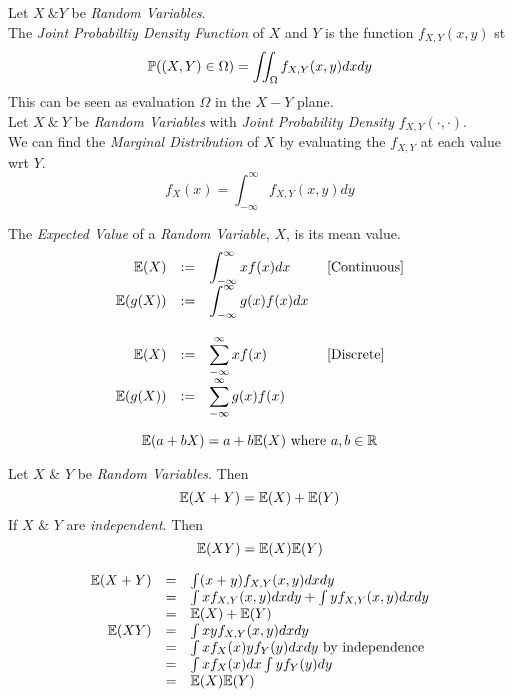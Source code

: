 \documentclass[11pt,a4paper]{article}
\begin{document}
Let $X\ \& Y$ be \textit{Random Variables}.\\
The \textit{Joint Probabiltiy Density Function} of $X$ and $Y$ is the function $f_{X,Y}(x,y)$ st
$$\mathbb{P}((X,Y)\in\Omega)=\iint_\Omega f_{X,Y}(x,y)dxdy$$
\nb This can be seen as evaluation $\Omega$ in the $X-Y$ plane.\\

Let $X\ \&\ Y$ be \textit{Random Variables} with \textit{Joint Probability Density} $f_{X,Y}(\cdot,\cdot)$.\\
We can find the \textit{Marginal Distribution} of $X$ by evaluating the $f_{X,Y}$ at each value wrt $Y$.
$$f_X(x)=\int_{-\infty}^\infty f_{X,Y}(x,y)dy$$

The \textit{Expected Value} of a \textit{Random Variable}, $X$, is its mean value.
\[\begin{array}{rcll}
\mathbb{E}(X)&:=&\displaystyle\int_{-\infty}^\infty xf(x)dx&\text{ [Continuous]}\\
\mathbb{E}(g(X))&:=&\displaystyle\int_{-\infty}^\infty g(x)f(x)dx&\\\\
\mathbb{E}(X)&:=&\displaystyle\sum_{-\infty}^\infty xf(x)&\text{ [Discrete]}\\
\mathbb{E}(g(X))&:=&\displaystyle\sum_{-\infty}^\infty g(x)f(x)&
\end{array}\]

$$\mathbb{E}(a+bX)=a+b\mathbb{E}(X)\text{ where }a,b\in\mathbb{R}$$

Let $X$ \& $Y$ be \textit{Random Variables}. Then
$$\mathbb{E}(X+Y)=\mathbb{E}(X)+\mathbb{E}(Y)$$
If $X$ \& $Y$ are \textit{independent}. Then
$$\mathbb{E}(XY)=\mathbb{E}(X)\mathbb{E}(Y)$$

\[\begin{array}{rcl}
\mathbb{E}(X+Y)&=&\int(x+y)f_{X,Y}(x,y)dxdy\\
&=&\int xf_{X,Y}(x,y)dxdy+\int yf_{X,Y}(x,y)dxdy\\
&=&\mathbb{E}(X)+\mathbb{E}(Y)\\
\mathbb{E}(XY)&=&\int xyf_{X,Y}(x,y)dxdy\\
&=&\int xf_X(x)yf_Y(y)dxdy\text{ by independence}\\
&=&\int xf_X(x)dx\int yf_Y(y)dy\\
&=&\mathbb{E}(X)\mathbb{E}(Y)
\end{array}\]
\end{document}
